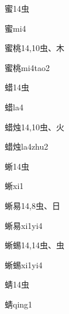\begin{Entry}{蜜}{14}{⾍}
  \begin{Phonetics}{蜜}{mi4}
  \end{Phonetics}
\end{Entry}

\begin{Entry}{蜜桃}{14,10}{⾍、⽊}
  \begin{Phonetics}{蜜桃}{mi4tao2}
  \end{Phonetics}
\end{Entry}

\begin{Entry}{蜡}{14}{⾍}
  \begin{Phonetics}{蜡}{la4}
  \end{Phonetics}
\end{Entry}

\begin{Entry}{蜡烛}{14,10}{⾍、⽕}
  \begin{Phonetics}{蜡烛}{la4zhu2}
  \end{Phonetics}
\end{Entry}

\begin{Entry}{蜥}{14}{⾍}
  \begin{Phonetics}{蜥}{xi1}
  \end{Phonetics}
\end{Entry}

\begin{Entry}{蜥易}{14,8}{⾍、⽇}
  \begin{Phonetics}{蜥易}{xi1yi4}
  \end{Phonetics}
\end{Entry}

\begin{Entry}{蜥蜴}{14,14}{⾍、⾍}
  \begin{Phonetics}{蜥蜴}{xi1yi4}
  \end{Phonetics}
\end{Entry}

\begin{Entry}{蜻}{14}{⾍}
  \begin{Phonetics}{蜻}{qing1}
  \end{Phonetics}
\end{Entry}

